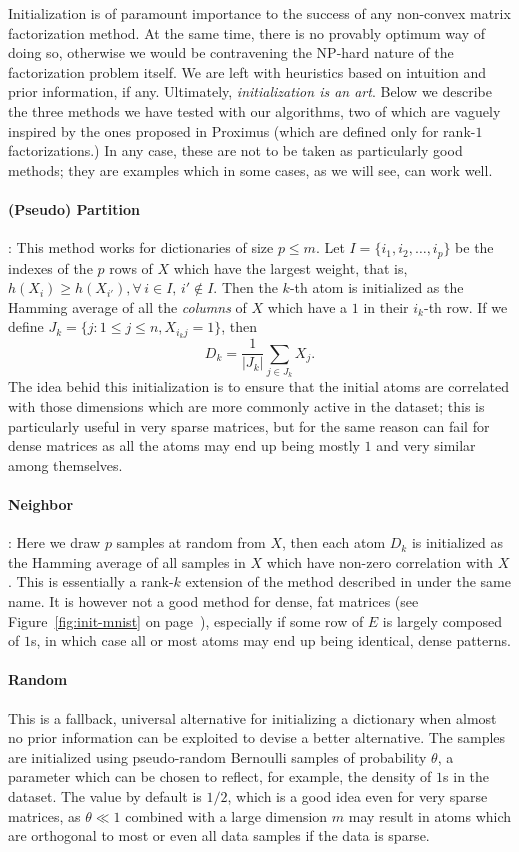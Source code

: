 \documentclass[twocolumn]{IEEEtran}
\theoremstyle{definition}
\begin{document}
Initialization is of paramount importance to the success of any non-convex matrix factorization method. At the same time, there is no provably optimum way of doing so, otherwise we would be contravening the NP-hard nature of the factorization problem itself. We are left with heuristics based on intuition and prior information, if any. Ultimately, \emph{initialization is an art}. Below we describe the three methods we have tested with our algorithms, two of which are vaguely inspired by the ones proposed in Proximus (which are defined only for rank-$1$ factorizations.) In any case, these are not to be taken as particularly good methods; they are examples which in some cases, as we will see, can work well. 

\paragraph{(Pseudo) Partition}: This method works for dictionaries of size $p \leq m$. Let $I=\{i_1,i_2,\ldots,i_p\}$ be the indexes of the $p$ rows of $X$ which have the largest weight, that is, $h(X_i) \geq h(X_{i'}),\forall\,i\in{I},\,i' \notin{I}$. Then the $k$-th atom is initialized as the Hamming average of all the \emph{columns} of $X$ which have a $1$ in their $i_k$-th row. If we define $J_k=\{j:1 \leq j \leq n, X_{i_kj}=1 \}$, then $$D_k = \frac{1}{|J_k|}\sum_{j \in J_k} X_j.$$ 
The idea behid this initialization is to ensure that the initial atoms are correlated with those dimensions which are more commonly active in the dataset; this is particularly useful in very sparse matrices, but for the same reason can fail for dense matrices as all the atoms may end up being mostly $1$ and very similar among themselves.
 
\paragraph{Neighbor}: Here we draw $p$ samples at random from $X$, then each atom $D_k$ is initialized as the Hamming average of all samples in $X$ which have non-zero correlation with $X$. This is essentially a rank-$k$ extension of the method described in \cite{proximus} under the same name. It is however not a good method for dense, fat matrices (see Figure~\ref{fig:init-mnist} on page~\pageref{fig:init-mnist}), especially if some row of $E$ is largely composed of $1$s, in which case all or most atoms may end up being identical, dense patterns.

\paragraph{Random} This is a fallback, universal alternative for initializing a dictionary when almost no prior information can be exploited to devise a better alternative. The samples are initialized using pseudo-random Bernoulli samples of probability $\theta$, a parameter which can be chosen to reflect, for example, the density of $1$s in the dataset.  The value by default is $1/2$, which is a good idea even for very sparse matrices, as $\theta \ll 1$ combined with a large dimension $m$ may result in atoms which are orthogonal to most or even all data samples if the data is sparse.
\end{document}

